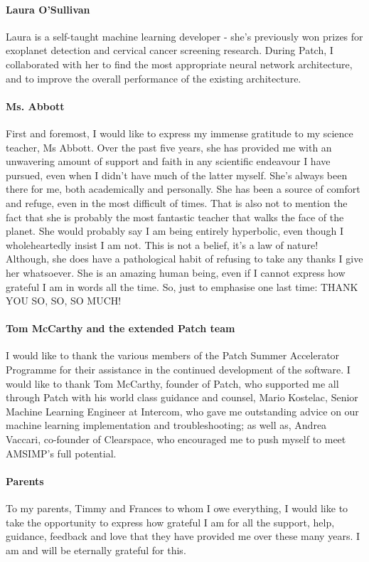 \paragraph{Laura O'Sullivan}
Laura is a self-taught machine learning developer - she’s previously won prizes for exoplanet detection and cervical cancer screening research. During Patch, I collaborated with her to find the most appropriate neural network architecture, and to improve the overall performance of the existing architecture.

\paragraph{Ms. Abbott} First and foremost, I would like to express my immense gratitude to my science teacher, Ms Abbott. Over the past five years, she has provided me with an unwavering amount of support and faith in any scientific endeavour I have pursued, even when I didn't have much of the latter myself. She’s always been there for me, both academically and personally. She has been a source of comfort and refuge, even in the most difficult of times. That is also not to mention the fact that she is probably the most fantastic teacher that walks the face of the planet. She would probably say I am being entirely hyperbolic, even though I wholeheartedly insist I am not. This is not a belief, it's a law of nature! Although, she does have a pathological habit of refusing to take any thanks I give her whatsoever. She is an amazing human being, even if I cannot express how grateful I am in words all the time. So, just to emphasise one last time:  THANK YOU SO, SO, SO MUCH!

\paragraph{Tom McCarthy and the extended Patch team}
I would like to thank the various members of the Patch Summer Accelerator Programme for their assistance in the continued development of the software. I would like to thank Tom McCarthy, founder of Patch, who supported me all through Patch with his world class guidance and counsel, Mario Kostelac, Senior Machine Learning Engineer at Intercom, who gave me outstanding advice on our machine learning implementation and troubleshooting; as well as, Andrea Vaccari, co-founder of Clearspace, who encouraged me to push myself to meet AMSIMP’s full potential. 

\paragraph{Parents} To my parents, Timmy and Frances to whom I owe everything, I would like to take the opportunity to express how grateful I am for all the support, help, guidance, feedback and love that they have provided me over these many years. I am and will be eternally grateful for this.

